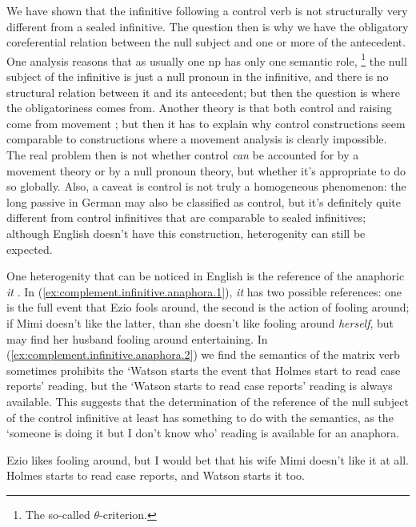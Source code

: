 \documentclass[UTF8, a4paper, oneside, scheme=plain, 12pt]{ctexbook}
\newcommand{\form}[1]{\emph{#1}}
\newcommand{\translate}[1]{`#1'}
\begin{document}
We have shown that the infinitive following a control verb 
is not structurally very different from a sealed infinitive. 
The question then is why we have the obligatory coreferential relation 
between the null subject and one or more of the antecedent.
One analysis reasons that as usually one \acs{np} has only one semantic role,%
\footnote{
    The so-called $\theta$-criterion.
} 
the null subject of the infinitive is just a null pronoun in the infinitive, 
and there is no structural relation between it and its antecedent; 
but then the question is where the obligatoriness comes from.
Another theory is that both control and raising come from movement
\citep{hornstein1999movement}; 
but then it has to explain why control constructions seem comparable to  
constructions where a movement analysis is clearly impossible.
The real problem then is not whether control \emph{can} be accounted for 
by a movement theory or by a null pronoun theory, 
but whether it's appropriate to do so globally.
Also, a caveat is control is not truly a homogeneous phenomenon: 
the long passive in German may also be classified as control, 
but it's definitely quite different from control infinitives 
that are comparable to sealed infinitives; 
although English doesn't have this construction, 
heterogenity can still be expected.

One heterogenity that can be noticed in English is the reference of the anaphoric \form{it}
\citep{wurmbrand2002syntactic}.
In (\ref{ex:complement.infinitive.anaphora.1}), 
\form{it} has two possible references: 
one is the full event that Ezio fools around, 
the second is the action of fooling around; 
if Mimi doesn't like the latter, than she doesn't like fooling around \emph{herself},
but may find her husband fooling around entertaining.
In (\ref{ex:complement.infinitive.anaphora.2}) 
we find the semantics of the matrix verb sometimes prohibits
the \translate{Watson starts the event that Holmes start to read case reports} reading, 
but the \translate{Watson starts to read case reports} reading is always available.
This suggests that the determination of the reference of the null subject of the control infinitive 
at least has something to do with the semantics, 
as the \translate{someone is doing it but I don't know who} reading 
is available for an anaphora.

\begin{exe}
    \ex\label{ex:complement.infinitive.anaphora.1} Ezio likes fooling around, but I would bet that his wife Mimi doesn't like it at all.
    \ex\label{ex:complement.infinitive.anaphora.2} Holmes starts to read case reports, and Watson starts it too. 
\end{exe}
\end{document}
